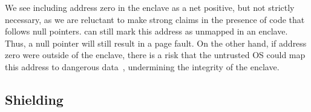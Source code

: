 
We see including address zero in the enclave as a net positive, but not strictly necessary, as we are reluctant to make strong claims 
in the presence of code that follows null pointers.
\graphenesgx{} can still mark this address as unmapped in an enclave.
Thus, a null pointer will still result in a page fault.
On the other hand, if address zero were outside of the enclave,
there is a risk that the untrusted OS could map this address to dangerous data~\cite{cve-2009-2692},
undermining the integrity of the enclave.
 
 

 





\subsection{Shielding \thehostabi{}}
\label{sec:sgx:shield:abi}


%



